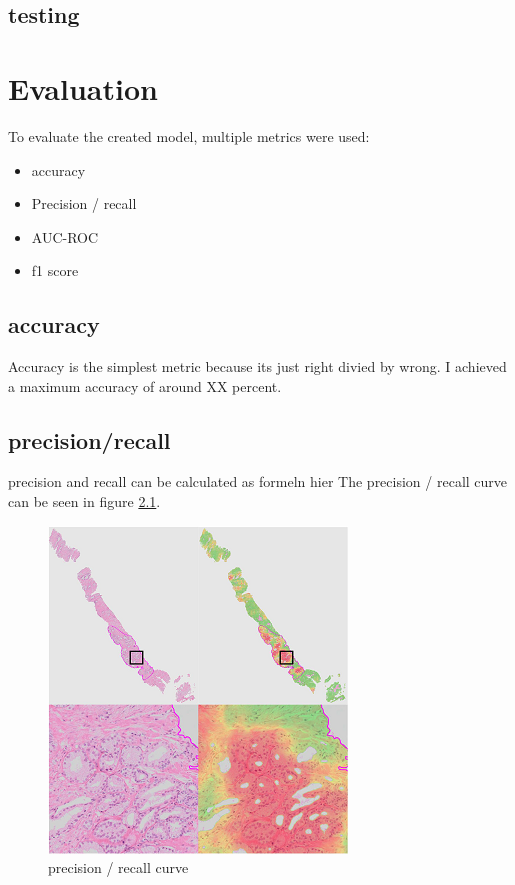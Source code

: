\section{testing}



\chapter{Evaluation}

To evaluate the created model, multiple metrics were used:

\begin{itemize}
	\item accuracy
	\item Precision / recall
	\item AUC-ROC
	\item f1 score
\end{itemize}

\section{accuracy}
Accuracy is the simplest metric because its just right divied by wrong. I achieved a maximum accuracy of around XX percent.

\section{precision/recall}
precision and recall can be calculated as formeln hier
The precision / recall curve can be seen in figure \ref{chart:prec_rec_curve}.

\begin{figure}
	\centering
	\includegraphics[scale=0.5]{images/CHANGE_THIS.png}
	\caption{precision / recall curve}
	\label{chart:prec_rec_curve}
\end{figure}

